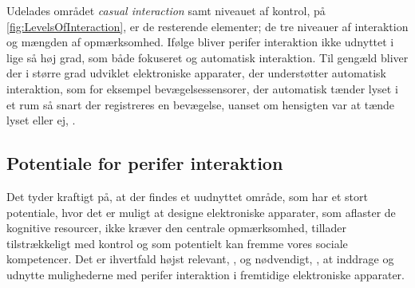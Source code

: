 %
Udelades området \textit{casual interaction} samt niveauet af kontrol, på \autoref{fig:LevelsOfInteraction}, er de resterende elementer; de tre niveauer af interaktion og mængden af opmærksomhed. Ifølge \textcite[s. 6]{PDF:PIIntroduction} bliver perifer interaktion ikke udnyttet i lige så høj grad, som både fokuseret og automatisk interaktion. Til gengæld bliver der i større grad udviklet elektroniske apparater, der understøtter automatisk interaktion, som for eksempel bevægelsessensorer, der automatisk tænder lyset i et rum så snart der registreres en bevægelse, uanset om hensigten var at tænde lyset eller ej, \parencite[s. 5]{PDF:PIIntroduction}.
% 
\subsection{Potentiale for perifer interaktion}
\label{Potentiale}
%
Det tyder kraftigt på, at der findes et uudnyttet område, som har et stort potentiale, hvor det er muligt at designe elektroniske apparater, som aflaster de kognitive resourcer, ikke kræver den centrale opmærksomhed, tillader tilstrækkeligt med kontrol og som potentielt kan fremme vores sociale kompetencer. Det er ihvertfald højst relevant, \parencite[s. 239]{PDF:PICharacteristicsAndConsiderations}, og nødvendigt, \parencite[s. 3]{PDF:TheComingAgeOfCalmTech}, at inddrage og udnytte mulighederne med perifer interaktion i fremtidige elektroniske apparater. 

